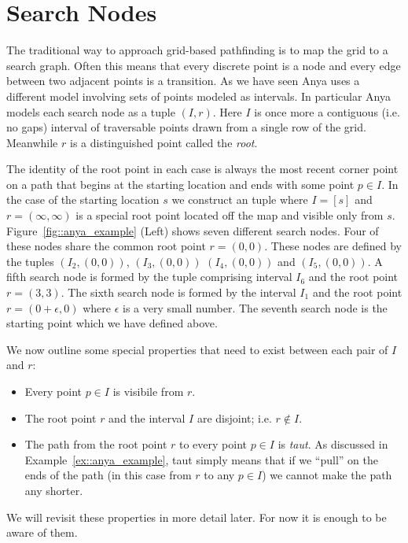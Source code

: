 \section{Search Nodes}
The traditional way to approach grid-based pathfinding is to map the grid to a
search graph. Often this means that every discrete point is a node and every edge
between two adjacent points is a transition.  As we have seen Anya uses a different 
model involving sets of points modeled as intervals.
In particular Anya models each search node as a tuple $(I, r)$. Here $I$ is once more a 
contiguous (i.e. no gaps) interval of traversable points drawn from a single row of the grid. Meanwhile
$r$ is a distinguished point called the \emph{root}. 

The identity of the root point in each case is always the most recent corner
point on a path that begins at the starting location and ends with some point
$p \in I$. 
In the case of the starting location $s$ we construct an tuple where
$I = [s]$ and $r = (\infty, \infty)$ is a special root point located
off the map and visible only from $s$.
Figure~\ref{fig::anya_example} (Left) shows seven different search nodes. Four 
of these nodes share the common root point $r = (0, 0)$. These nodes are defined
by the tuples $(I_2, (0, 0))$, $(I_3, (0, 0))$
$(I_4, (0, 0))$ and $(I_5, (0, 0))$. A fifth search node is formed by the
tuple comprising interval $I_6$ and the root point $r = (3, 3)$. 
The sixth search node is formed by the interval $I_1$ and the root point
$r = (0 + \epsilon, 0)$ where $\epsilon$ is a very small number. The seventh
search node is the starting point which we have defined above.

We now outline some special properties that need to exist between each pair 
of $I$ and $r$:
\begin{itemize}
\item{Every point $p \in I$ is visibile from $r$.}
\item{The root point $r$ and the interval $I$ are disjoint; i.e. $r \not\in I$.}
\item{The path from the root point $r$ to every point $p \in I$ is \emph{taut}.
As discussed in Example~\ref{ex::anya_example}, taut simply means that if we
``pull'' on the ends of the path (in this case from $r$ to any $p \in I$) we cannot 
make the path any shorter.}
\end{itemize}
We will revisit these properties in more detail later. For now it is
enough to be aware of them.

